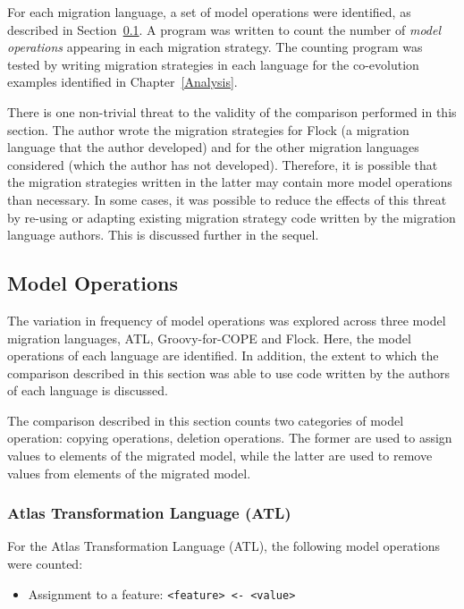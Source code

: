 For each migration language, a set of model operations were identified, as described in Section~\ref{subsubsec:quantitive_model_operations}. A program was written to count the number of \emph{model operations} appearing in each migration strategy. The counting program was tested by writing migration strategies in each language for the co-evolution examples identified in Chapter~\ref{Analysis}.

There is one non-trivial threat to the validity of the comparison performed in this section. The author wrote the migration strategies for Flock (a migration language that the author developed) and for the other migration languages considered (which the author has not developed). Therefore, it is possible that the migration strategies written in the latter may contain more model operations than necessary. In some cases, it was possible to reduce the effects of this threat by re-using or adapting existing migration strategy code written by the migration language authors. This is discussed further in the sequel.

\subsection{Model Operations}
\label{subsubsec:quantitive_model_operations}
The variation in frequency of model operations was explored across three model migration languages, ATL, Groovy-for-COPE and Flock. Here, the model operations of each language are identified. In addition, the extent to which the comparison described in this section was able to use code written by the authors of each language is discussed.

The comparison described in this section counts two categories of model operation: copying operations, deletion operations. The former are used to assign values to elements of the migrated model, while the latter are used to remove values from elements of the migrated model.

\subsubsection{Atlas Transformation Language (ATL)}
For the Atlas Transformation Language (ATL), the following model operations were counted:
	
\begin{itemize}
	\item Assignment to a feature:
	\subitem \texttt{<feature> <- <value>} 
\end{itemize}

